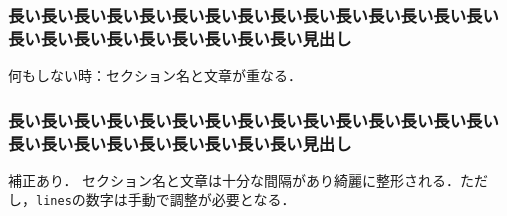 \documentclass[
  platex, dvipdfmx,  %
]{nlp2024}
\newcommand{\code}[1]{\texttt{#1}}
\begin{document}
\subsubsection{長い長い長い長い長い長い長い長い長い長い長い長い長い長い長い長い長い長い長い長い長い長い長い長い見出し}

何もしない時：セクション名と文章が重なる．


\subsubsection{長い長い長い長い長い長い長い長い長い長い長い長い長い長い長い長い長い長い長い長い長い長い長い長い見出し}
\restoresection

補正あり．
セクション名と文章は十分な間隔があり綺麗に整形される．ただし，\code{lines}の数字は手動で調整が必要となる．
\end{document}
